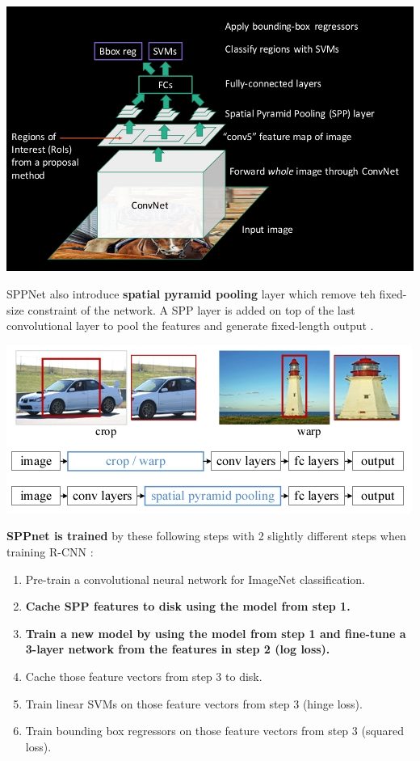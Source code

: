 \documentclass{article}
\begin{document}
\begin{center}
	\includegraphics[scale=0.4]{sppnet_detail}
\end{center}

SPPNet also introduce \textbf{spatial pyramid pooling} layer which remove teh fixed-size constraint of the network. A SPP layer is added on top of the last convolutional layer to pool the features and generate fixed-length output \cite{arxiv/sppnet}.

\begin{center}
	\includegraphics[scale=0.5]{sppnet}
\end{center}

\noindent \textbf{SPPnet is trained} by these following steps with 2 slightly different steps when training R-CNN \cite{slides/rcnn-serie}:
\begin{enumerate}
	\item Pre-train a convolutional neural network for ImageNet classification.
	\item \textbf{Cache SPP features to disk using the model from step 1.}
	\item \textbf{Train a new model by using the model from step 1 and fine-tune a 3-layer network from the features in step 2 (log loss).}
	\item Cache those feature vectors from step 3 to disk.
	\item Train linear SVMs on those feature vectors from step 3 (hinge loss).
	\item Train bounding box regressors on those feature vectors from step 3 (squared loss).
\end{enumerate}
\end{document}
